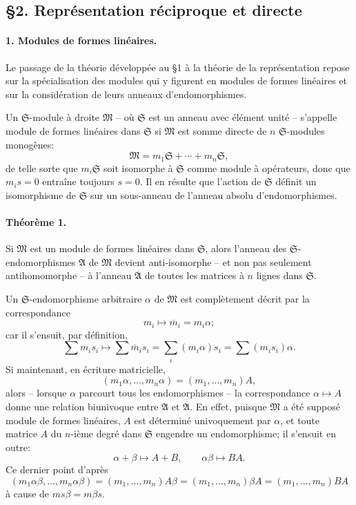 \providecommand{\frA}{\mathfrak A}
\providecommand{\frB}{\mathfrak B}
\providecommand{\frR}{\mathfrak R}
\providecommand{\frS}{\mathfrak S}
\providecommand{\frT}{\mathfrak T}
\providecommand{\frM}{\mathfrak M}
\providecommand{\frN}{\mathfrak N}
\providecommand{\mA}{\mathfrak A}
\providecommand{\mbarA}{\overline{\mathfrak A}}

\subsection*{\S 2. Représentation réciproque et directe}

\paragraph{1. Modules de formes linéaires.}
Le passage de la théorie développée au \S 1 à la théorie de la représentation repose sur la spécialisation des modules qui y figurent en modules de formes linéaires et sur la considération de leurs anneaux d'endomorphismes.

Un \(\frS\)-module à droite \(\frM\) -- où \(\frS\) est un anneau avec élément unité -- s'appelle module de formes linéaires dans \(\frS\) si \(\frM\) est somme directe de \(n\) \(\frS\)-modules monogènes:
\[
        \frM=m_1\frS+\cdots+m_n\frS,
\]
de telle sorte que \(m_i\frS\) soit isomorphe à \(\frS\) comme module à opérateurs, donc que \(m_i s=0\) entraîne toujours \(s=0\). Il en résulte que l'action de \(\frS\) définit un isomorphisme de \(\frS\) sur un sous-anneau de l'anneau absolu d'endomorphismes.

\paragraph{Théorème 1.}
Si \(\frM\) est un module de formes linéaires dans \(\frS\), alors l'anneau des \(\frS\)-endomorphismes \(\mA\) de \(\frM\) devient anti-isomorphe -- et non pas seulement antihomomorphe -- à l'anneau \(\mbarA\) de toutes les matrices à \(n\) lignes dans \(\frS\).

Un \(\frS\)-endomorphisme arbitraire \(\alpha\) de \(\frM\) est complètement décrit par la correspondance
\[
        m_i\longmapsto \overline m_i=m_i\alpha;
\]
car il s'ensuit, par définition,
\[
        \sum m_i s_i\longmapsto
        \sum \overline m_i s_i
        =\sum_i (m_i\alpha)s_i
        =\sum (m_i s_i)\alpha.
\]
Si maintenant, en écriture matricielle,
\[
        (m_1\alpha,\ldots,m_n\alpha)=(m_1,\ldots,m_n)A,
\]
alors -- lorsque \(\alpha\) parcourt tous les endomorphismes -- la correspondance \(\alpha\mapsto A\) donne une relation biunivoque entre \(\mA\) et \(\mbarA\). En effet, puisque \(\frM\) a été supposé module de formes linéaires, \(A\) est déterminé univoquement par \(\alpha\), et toute matrice \(A\) du \(n\)-ième degré dans \(\frS\) engendre un endomorphisme; il s'ensuit en outre:
\[
        \alpha+\beta\mapsto A+B,\qquad
        \alpha\beta\mapsto BA.
\]
Ce dernier point d'après
\[
        (m_1\alpha\beta,\ldots,m_n\alpha\beta)
        =(m_1,\ldots,m_n)A\beta
        =(m_1,\ldots,m_n)\beta A
        =(m_1,\ldots,m_n)BA
\]
à cause de \(ms\beta=m\beta s\).

